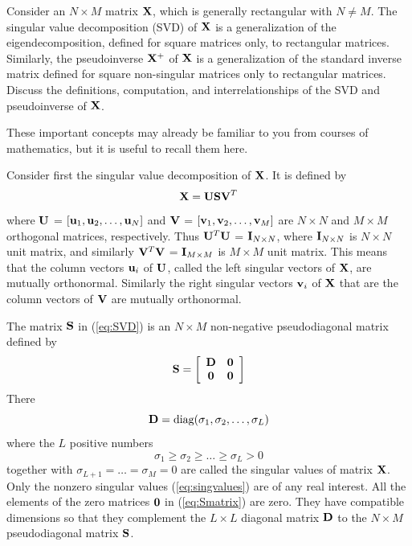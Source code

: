\begin{enumerate}
  Consider an $N \times M$ matrix ${\bf X}$, which is generally
  rectangular with $N \neq M$.  The singular value decomposition (SVD)
  of ${\bf X}$ is a generalization of the eigendecomposition, defined
  for square matrices only, to rectangular matrices.  Similarly, the
  pseudoinverse ${\bf X}^+$ of ${\bf X}$ is a generalization of the
  standard inverse matrix defined for square non-singular matrices
  only to rectangular matrices. Discuss the definitions, computation,
  and interrelationships of the SVD and pseudoinverse of ${\bf X}$.

  \begin{solution}

    These important concepts may already be familiar to you from courses of mathematics,
    but it is useful to recall them here.

    Consider first the singular value decomposition of ${\bf X}$. It is defined by
    \begin{equation}
      {\bf X} = {\bf USV}^T
      \label{eq:SVD}
    \end{equation}
    where ${\bf U}$ = $[{\bf u}_1,{\bf u}_2,\ldots,{\bf u}_N]$ and ${\bf V}$ =
    $[{\bf v}_1,{\bf v}_2,\ldots,{\bf v}_M]$ are $N \times N$ and $M \times M$
    orthogonal matrices, respectively. Thus ${\bf U}^T{\bf U}$ = ${\bf I}_{N \times N}$,
    where ${\bf I}_{N \times N}$ is $N \times N$ unit matrix, and similarly
    ${\bf V}^T{\bf V}$ = ${\bf I}_{M \times M}$ is $M \times M$ unit matrix. This means
    that the column vectors ${\bf u}_i$ of ${\bf U}$, called the left singular vectors
    of ${\bf X}$, are mutually orthonormal. Similarly the right singular vectors
    ${\bf v}_i$ of ${\bf X}$ that are the column vectors of ${\bf V}$ are mutually
    orthonormal.

    The matrix ${\bf S}$ in (\ref{eq:SVD}) is an $N \times M$ non-negative pseudodiagonal
    matrix defined by 
    \begin{equation}
      {\bf S} = \left[ \begin{array}{cc}
          {\bf D} & {\bf 0} \\
          {\bf 0} & {\bf 0} \end{array} \right]
      \label{eq:Smatrix}
    \end{equation}
    There 
    \begin{equation}
      {\bf D} = \mbox{diag}(\sigma_1,\sigma_2,\ldots,\sigma_L)
      \label{eq:Dmatrix}
    \end{equation}
    where the $L$ positive numbers 
    \begin{equation}
      \sigma_1 \geq \sigma_2 \geq \ldots \geq \sigma_L > 0
      \label{eq:singvalues}
    \end{equation}
    together with $\sigma_{L+1} = \ldots = \sigma_M = 0$ are called the singular values
    of matrix ${\bf X}$. Only the nonzero singular values (\ref{eq:singvalues}) are of
    any real interest. All the elements of the zero matrices ${\bf 0}$ in (\ref{eq:Smatrix})
    are zero. They have compatible dimensions so that they complement the $L \times L$
    diagonal matrix ${\bf D}$ to the $N \times M$ pseudodiagonal matrix ${\bf S}$.


\end{solution}
\end{enumerate}

